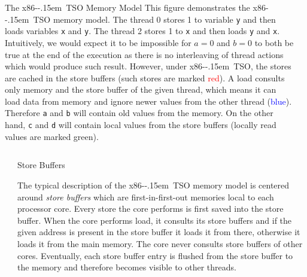 \documentclass[final, 20pt, a0]{beamer}
\newlength{\marginwid}
\newlength{\onecolwid}
\newlength{\twocolwid}
\newcommand{\xtso}{\mbox{x86-\kern-.15em TSO}\xspace}
\begin{document}
\begin{frame}[t]
\begin{columns}[t]
\begin{column}{\twocolwid}
\begin{block}{The \xtso Memory Model}
  This figure demonstrates the \xtso memory model.
  The thread 0 stores 1 to variable \texttt{y} and then loads variables \texttt{x} and \texttt{y}.
  The thread 2 stores 1 to \texttt{x} and then loads \texttt{y} and \texttt{x}.
  Intuitively, we would expect it to be impossible for $a = 0$ and $b = 0$ to both be true at the end of the execution as there is no interleaving of thread actions which would produce such result.
  However, under \xtso, the stores are cached in the store buffers (such stores are marked \textcolor{red}{red}).
  A load consults only memory and the store buffer of the given thread, which means it can load data from memory and ignore newer values from the other thread (\textcolor{blue}{blue}).
  Therefore \texttt{a} and \texttt{b} will contain old values from the memory.
  On the other hand, \texttt{c} and \texttt{d} will contain local values from the store buffers (locally read values are marked \textcolor{dgreen}{green}).

\end{block}

\end{column} %

\begin{column}{\marginwid}\end{column} %

\end{columns}

\begin{columns}[t]

\begin{column}{\marginwid}\end{column} %

\begin{column}{\onecolwid}

\begin{block}{Store Buffers}

The typical description of the \xtso memory model is centered around
\emph{store buffers} which are first-in-first-out memories local to each
processor core. Every store the core performs is first saved into the store
buffer. When the core performs load, it consults its store buffers and if the
given address is present in the store buffer it loads it from there, otherwise
it loads it from the main memory. The core never consults store buffers of
other cores. Eventually, each store buffer entry is flushed from the store
buffer to the memory and therefore becomes visible to other threads.


\end{block}
\end{column}
\end{columns}
\end{frame}
\end{document}
